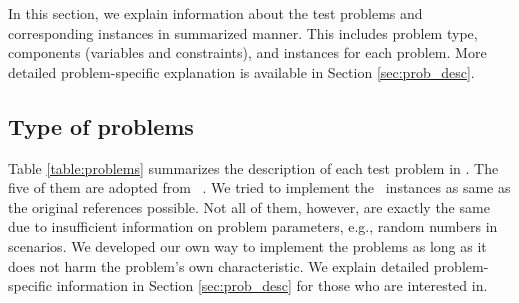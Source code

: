 In this section, we explain information about the test problems and corresponding instances in summarized manner. This includes problem type, components (variables and constraints), and instances for each problem. More detailed problem-specific explanation is available in Section \ref{sec:prob_desc}.
\subsection{Type of problems}
Table \ref{table:problems} summarizes the description of each test problem in \siplibtwo. The five of them are adopted from \siplib\ \cite{web:SIPLIB1}. We tried to implement the \siplib\ instances as same as the original references possible. Not all of them, however, are exactly the same due to insufficient information on problem parameters, e.g., random numbers in scenarios. We developed our own way to implement the problems as long as it does not harm the problem's own characteristic. We explain detailed problem-specific information in Section \ref{sec:prob_desc} for those who are interested in.
\begin{table}[H]
	\centering
	\caption{Problems in \texttt{SIPLIB 2.0}}
	\label{table:problems}
\end{table}

